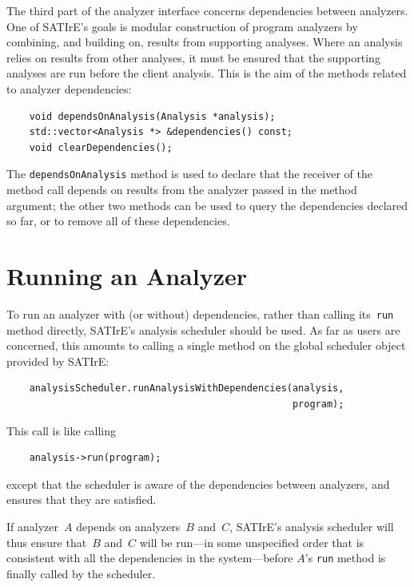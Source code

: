 \documentclass[a4paper,12pt]{report}
\begin{document}
The third part of the analyzer interface concerns dependencies between
analyzers. One of SATIrE's goals is modular construction of program
analyzers by combining, and building on, results from supporting analyses.
Where an analysis relies on results from other analyses, it must be ensured
that the supporting analyses are run before the client analysis. This is the
aim of the methods related to analyzer dependencies:
\begin{verbatim}
    void dependsOnAnalysis(Analysis *analysis);
    std::vector<Analysis *> &dependencies() const;
    void clearDependencies();
\end{verbatim}
The \texttt{dependsOnAnalysis} method is used to declare that the receiver
of the method call depends on results from the analyzer passed in the method
argument; the other two methods can be used to query the dependencies
declared so far, or to remove all of these dependencies.

\section{Running an Analyzer}
\label{sec:run_analyzer}

To run an analyzer with (or without) dependencies, rather than calling
its~\texttt{run} method directly, SATIrE's analysis scheduler should be
used. As far as users are concerned, this amounts to calling a single method
on the global scheduler object provided by SATIrE:
\begin{verbatim}
    analysisScheduler.runAnalysisWithDependencies(analysis,
                                                  program);
\end{verbatim}
This call is like calling
\begin{verbatim}
    analysis->run(program);
\end{verbatim}
except that the scheduler is aware of the dependencies between analyzers,
and ensures that they are satisfied.

If analyzer~\(A\) depends on analyzers~\(B\) and~\(C\), SATIrE's analysis
scheduler will thus ensure that~\(B\) and~\(C\) will be run---in some
unspecified order that is consistent with all the dependencies in the
system---before \(A\)'s \texttt{run} method is finally called by the
scheduler.

%
\end{document}
